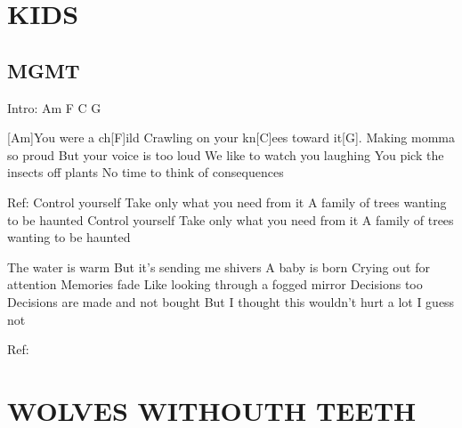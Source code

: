 \documentclass{article}
\begin{document}
\section*{KIDS}
%
\subsection*{MGMT}
\begin{guitar}
	Intro: Am F C G
	
	[Am]You were a ch[F]ild
	Crawling on your kn[C]ees toward it[G]. 
	Making momma so proud
	But your voice is too loud
	We like to watch you laughing
	You pick the insects off plants
	No time to think of consequences
	
	
	Ref:
	Control yourself
	Take only what you need from it
	A family of trees wanting to be haunted
	Control yourself
	Take only what you need from it
	A family of trees wanting to be haunted
	
	
	The water is warm
	But it's sending me shivers
	A baby is born
	Crying out for attention
	Memories fade
	Like looking through a fogged mirror
	Decisions too
	Decisions are made and not bought
	But I thought this wouldn't hurt a lot
	I guess not
	
	Ref:

\end{guitar}

\section*{WOLVES WITHOUTH TEETH}
%
\end{document}
